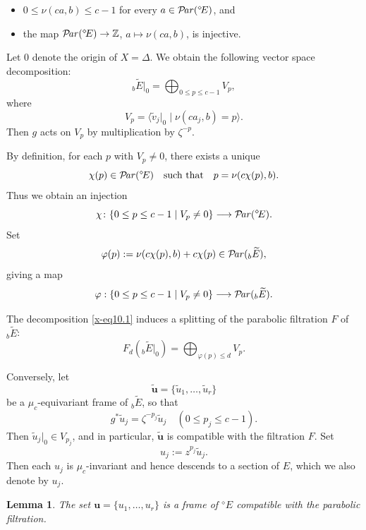 \documentclass[12pt,twoside]{amsart}
\DeclareMathOperator{\Par}{\mathcal{P}\!\it{ar}}
\newtheorem{lem}[thm]{Lemma}
\theoremstyle{definition}
\begin{document}
\begin{itemize}
\item $0\le \nu(ca,b)\le c-1$ for every $a\in \Par({}^\diamond\!E)$, and  
\item the map $\Par({}^\diamond\!E)\to \mathbb Z$, $a\mapsto \nu(ca,b)$, is injective.
\end{itemize}

Let $0$ denote the origin of $X=\Delta$.  
We obtain the following vector space decomposition:
\begin{equation}\label{x-eq10.1}
{}_b \widetilde E|_0 = \bigoplus_{0\le p\le c-1} V_p,
\end{equation}
where
\[
V_p = \langle \widetilde v_j|_0 \mid \nu(ca_j,b)=p \rangle.
\]
Then $g$ acts on $V_p$ by multiplication by $\zeta^{-p}$.

By definition, for each $p$ with $V_p\neq 0$, 
there exists a unique 
\[
\chi(p) \in \Par({}^\diamond\!E)
\quad\text{such that}\quad
p=\nu(c\chi(p),b).
\]
Thus we obtain an injection
\begin{equation}\label{x-eq10.2}
\chi\colon \{0\le p\le c-1 \mid V_p\ne 0\}
\longrightarrow \Par({}^\diamond\!E).
\end{equation}
Set
\[
\varphi(p):=\nu(c\chi(p),b)+c\chi(p)\in \Par({}_b\widetilde E),
\]
giving a map
\begin{equation}\label{x-eq10.3}
\varphi:
\{0\le p\le c-1 \mid V_p\ne 0\}
\longrightarrow
\Par({}_b\widetilde E).
\end{equation}

The decomposition \eqref{x-eq10.1} induces a splitting of the parabolic filtration $F$ of ${}_b\widetilde E$:
\[
F_d({}_b\widetilde E|_0)
=
\bigoplus_{\varphi(p)\le d} V_p.
\]

Conversely, let 
\[
\widetilde{\bm u}=\{\widetilde u_1,\ldots,\widetilde u_r\}
\]
be a $\mu_c$-equivariant frame of ${}_b\widetilde E$, 
so that
\[
g^*\widetilde u_j=\zeta^{-p_j}\widetilde u_j
\quad
(0\le p_j\le c-1).
\]
Then $\widetilde u_j|_0\in V_{p_j}$, and in particular, 
$\widetilde{\bm u}$ is compatible with the filtration $F$.  
Set
\[
u_j:=z^{p_j}\widetilde u_j.
\]
Then each $u_j$ is $\mu_c$-invariant and hence descends to a section of $E$, 
which we also denote by $u_j$.

\begin{lem}\label{x-lem10.3}
The set $\bm u=\{u_1,\ldots,u_r\}$ is a frame of ${}^\diamond\!E$ 
compatible with the parabolic filtration.
\end{lem}
\end{document}
